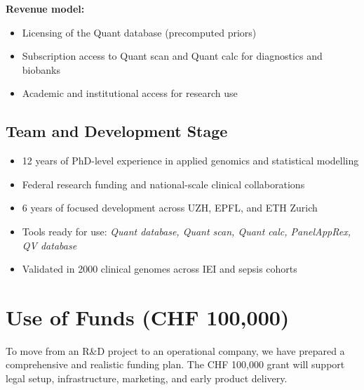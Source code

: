 \documentclass[preprint,12pt,fleqn]{article}
\begin{document}
\textbf{Revenue model:}
\begin{itemize}
  \item Licensing of the Quant database (precomputed priors)
  \item Subscription access to Quant scan and Quant calc for diagnostics and biobanks
  \item Academic and institutional access for research use
\end{itemize}

\subsection{Team and Development Stage}

\begin{itemize}
  \item 12 years of PhD-level experience in applied genomics and statistical modelling
  \item Federal research funding and national-scale clinical collaborations
  \item 6 years of focused development across UZH, EPFL, and ETH Zurich
  \item Tools ready for use: \textit{Quant database, Quant scan, Quant calc, PanelAppRex, QV database}
  \item Validated in 2000 clinical genomes across IEI and sepsis cohorts
\end{itemize}


\section{Use of Funds (CHF 100,000)}

To move from an R\&D project to an operational company, we have prepared a comprehensive and realistic funding plan. The CHF 100,000 grant will support legal setup, infrastructure, marketing, and early product delivery.
\end{document}
